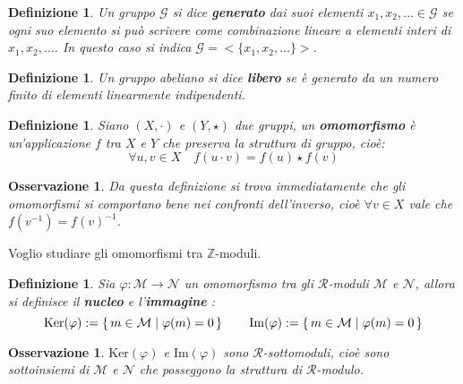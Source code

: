 \documentclass[10pt, twoside=false, x11names]{scrbook}
\newtheorem{osservation}[theorem]{Osservazione}
\newtheorem{definition}[theorem]{Definizione}
\newcommand{\R}{\mathcal{R}}
\newcommand{\M}{\mathcal{M}}
\newcommand{\N}{\mathcal{N}}
\newcommand{\Z}{\mathbb{Z}}
\newcommand{\im}[1]{\mathrm{Im}( #1 )}
\renewcommand{\ker}[1]{\mathrm{Ker}( #1)}
\renewcommand{\phi}{\varphi}
\begin{document}
\begin{definition}
  Un gruppo $ \mathcal{G} $ si dice \textbf{generato}
  dai suoi elementi $ x_1, x_2, \dots \in \mathcal{G} $ se
  ogni suo elemento si può scrivere come combinazione lineare a elementi interi di $ x_1, x_2, \dots $.
  In questo caso si indica $ \mathcal{G} = < \{ x_1, x_2, \dots \} > $.
\end{definition}

\begin{definition}
  Un gruppo abeliano si dice \textbf{libero}\index{$ \Z $-modulo libero} se è generato
  da un numero finito di elementi linearmente indipendenti.
\end{definition}

\begin{definition}
  Siano $ (X, \cdot) $ e $ (Y, \star) $ due gruppi, un \textbf{omomorfismo}  è un'applicazione $ f $
  tra $ X $ e $ Y $ che preserva la struttura di gruppo, cioè:
  \[
    \forall u,v \in X \quad f(u \cdot v) = f(u) \star f(v)
  \]
\end{definition}

\begin{osservation}
  Da questa definizione si trova immediatamente che gli omomorfismi si comportano bene nei
  confronti dell'inverso, cioè $ \forall v \in X $ vale che $ f(v^{-1}) = {f(v)}^{-1} $.
\end{osservation}

Voglio studiare gli omomorfismi tra $ \Z $-moduli.

\begin{definition}
  Sia $ \phi: \M \to \N $ un omomorfismo tra gli $ \R $-moduli $ \M $ e $ \N $,
  allora si definisce il \textbf{nucleo}  e l'\textbf{immagine} :
  \[
    \ker {\phi} := \set{ m \in \M | \phi(m) = 0}  \qquad  \im{\phi} := \set{ m \in \M | \phi(m) = 0}
  \]
\end{definition}

\begin{osservation}
  $ \ker{\phi} $ e $ \im{\phi} $ sono $ \R $-sottomoduli, cioè sono sottoinsiemi di $ \M $ e $ \N $
  che posseggono la struttura di $ \R $-modulo.
\end{osservation}
\end{document}
